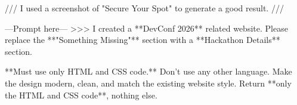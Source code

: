 

/// I used a screenshot of "Secure Your Spot" to generate a good result. ///

---Prompt here---
>>> I created a **DevConf 2026** related website. Please replace the **"Something Missing"** section with a **Hackathon Details** section.

**Must use only HTML and CSS code.** Don't use any other language. 
Make the design modern, clean, and match the existing website style. 
Return **only the HTML and CSS code**, nothing else.
